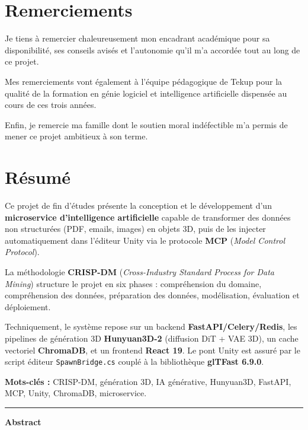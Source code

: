 \documentclass[12pt,a4paper,oneside]{report}
\begin{document}
\chapter*{Remerciements}

Je tiens à remercier chaleureusement mon encadrant académique pour sa
disponibilité, ses conseils avisés et l'autonomie qu'il m'a accordée
tout au long de ce projet.

Mes remerciements vont également à l'équipe pédagogique de Tekup pour la
qualité de la formation en génie logiciel et intelligence artificielle
dispensée au cours de ces trois années.

Enfin, je remercie ma famille dont le soutien moral indéfectible m'a permis
de mener ce projet ambitieux à son terme.

\cleardoublepage
\chapter*{Résumé}

Ce projet de fin d'études présente la conception et le développement d'un
\textbf{microservice d'intelligence artificielle} capable de transformer des
données non structurées (PDF, emails, images) en objets 3D, puis de les
injecter automatiquement dans l'éditeur Unity via le protocole \textbf{MCP}
(\textit{Model Control Protocol}).

La méthodologie \textbf{CRISP-DM} (\textit{Cross-Industry Standard Process for
Data Mining}) structure le projet en six phases : compréhension du domaine,
compréhension des données, préparation des données, modélisation, évaluation
et déploiement.

Techniquement, le système repose sur un backend \textbf{FastAPI/Celery/Redis},
les pipelines de génération 3D \textbf{Hunyuan3D-2} (diffusion DiT + VAE 3D),
un cache vectoriel \textbf{ChromaDB}, et un frontend \textbf{React 19}. Le
pont Unity est assuré par le script éditeur \texttt{SpawnBridge.cs} couplé
à la bibliothèque \textbf{glTFast 6.9.0}.

\textbf{Mots-clés :} CRISP-DM, génération 3D, IA générative, Hunyuan3D,
FastAPI, MCP, Unity, ChromaDB, microservice.

\vspace{0.8cm}
\noindent\rule{\linewidth}{0.4pt}
\begin{center}\textbf{Abstract}\end{center}
\end{document}
